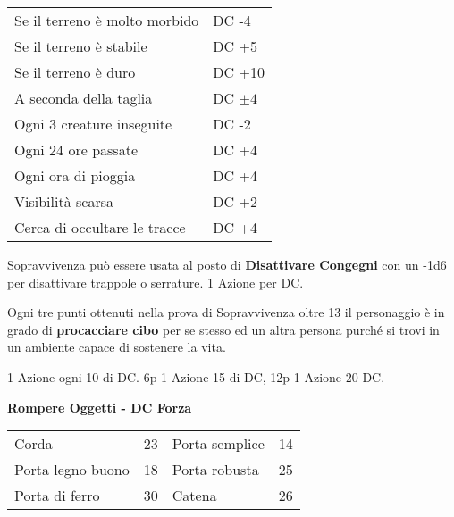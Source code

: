 \documentclass[landscape,10pt,a4paper]{article}
\begin{document}
\begin{multicols}{3}
\begin{dmbox}[title=Seguire Tracce]
\noindent\begin{tabular}{ll}
		Se il terreno è molto morbido& DC -4\\
		Se il terreno è stabile& DC +5\\
		Se il terreno è duro& DC +10\\
		A seconda della taglia& DC $\pm4$\\
		Ogni 3 creature inseguite& DC -2\\
		Ogni 24 ore passate& DC +4\\
		Ogni ora di pioggia& DC +4\\
		Visibilità scarsa& DC +2\\
		Cerca di occultare le tracce& DC +4\\		
\end{tabular}
\end{dmbox}		

\begin{dmbox}[title=Sopravvivenza]
Sopravvivenza può essere usata al posto di \textbf{Disattivare Congegni} con un -1d6 per disattivare trappole o serrature. 1 Azione per DC.

Ogni tre punti ottenuti nella prova di Sopravvivenza oltre 13 il personaggio è in grado di \textbf{procacciare cibo} per se stesso ed un altra persona purché si trovi in un ambiente capace di sostenere la vita.
\end{dmbox}		

\begin{dmbox}[title=Artista della Fuga]
1 Azione ogni 10 di DC. 6p 1 Azione 15 di DC, 12p 1 Azione 20 DC.
\end{dmbox}		

\begin{dmbox}[title=Danni temporanei]	
	\textbf{Rompere Oggetti - DC Forza}\\
	\begin{tabular}{ll|ll}
		Corda   		   & 23&	Porta semplice         & 14\\
		Porta legno buono  & 18&	Porta robusta          & 25\\
		Porta di ferro     & 30&	Catena                 & 26 \\
	\end{tabular}
\end{dmbox}			


\end{multicols}
\end{document}
